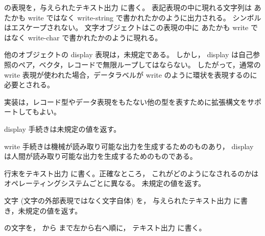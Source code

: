 \begin{entry}{%
}

 の表現を，与えられたテキスト出力  に書く。
表記表現の中に現れる文字列は
あたかも {\cf write} ではなく {\cf write-string} で書かれたかのように出力される。
シンボルはエスケープされない。
文字オブジェクトはこの表現の中に
あたかも {\cf write} ではなく {\cf write-char} で書かれたかのように現れる。

他のオブジェクトの {\cf display} 表現は，未規定である。
しかし， {\cf display} は自己参照のペア，ベクタ，レコードで無限ループしてはならない。
したがって，通常の {\cf write} 表現が使われた場合，データラベルが {\cf write} のように環状を表現するのに必要とされる。

実装は，レコード型やデータ表現をもたない他の型を表すために拡張構文をサポートしてもよい。

{\cf display} 手続きは未規定の値を返す。

\begin{rationale}
{\cf write} 手続きは機械が読み取り可能な出力を生成するためのものあり，
{\cf display} は人間が読み取り可能な出力を生成するためのものである。
\end{rationale}
\end{entry}


\begin{entry}{%
}

行末をテキスト出力  に書く。正確なところ，
これがどのようになされるのかはオペレーティングシステムごとに異なる。
未規定の値を返す。

\end{entry}


\begin{entry}{%
}

文字  (文字の外部表現ではなく文字自体) を，
与えられたテキスト出力  に書き，未規定の値を返す。

\end{entry}

\begin{entry}{%
}

 の文字を， から  まで左から右へ順に，
テキスト出力  に書く。

\end{entry}

